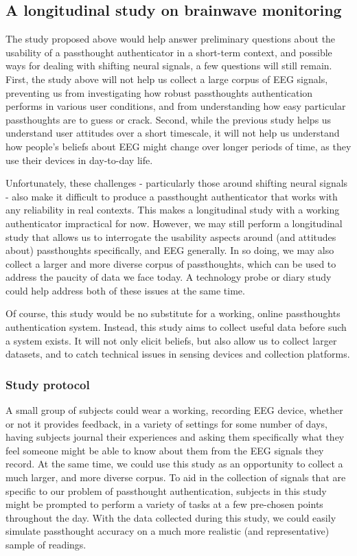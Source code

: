 \documentclass[sigconf]{acmart}
\begin{document}
\subsection{A longitudinal study on brainwave monitoring}
\label{sec:orge5483b9}

The study proposed above would help answer preliminary questions about
the usability of a passthought authenticator in a short-term context,
and possible ways for dealing with shifting neural signals,
a few questions will still remain.
First, the study above will not help us collect a large corpus of EEG signals, 
preventing us from investigating how robust passthoughts authentication performs in various user conditions,
and from understanding how easy particular passthoughts are to guess or crack.
Second, while the previous study helps us understand user attitudes over a short timescale,
it will not help us understand how people's beliefs about EEG might change over longer periods of time, as they use their devices in day-to-day life.

Unfortunately, these challenges - particularly those around shifting neural signals - also make it difficult to produce a passthought authenticator that works with any reliability in real contexts.
This makes a longitudinal study with a working authenticator impractical for now.
However, we may still perform a longitudinal study that allows us to interrogate the usability aspects around (and attitudes about) passthoughts specifically, and EEG generally.
In so doing, we may also collect a larger and more diverse corpus of passthoughts, which can be used to address the paucity of data we face today.
A technology probe or diary study \cite{Gaver1999} could help address both of these issues at the same time.

Of course, this study would be no substitute for a working, online passthoughts authentication system.
Instead, this study aims to collect useful data before such a system exists.
It will not only elicit beliefs, 
but also allow us to collect larger datasets, 
and to catch technical issues in sensing devices and collection platforms.

\subsubsection{Study protocol}
\label{sec:org63572ed}
A small group of subjects could wear a working, recording EEG device, whether or not it provides feedback, in a variety of settings for some number of days,
having subjects journal their experiences and asking them specifically what they feel someone might be able to know about them from the EEG signals they record.
At the same time, we could use this study as an opportunity to collect a much larger, and more diverse corpus.
To aid in the collection of signals that are specific to our problem of passthought authentication,
subjects in this study might be prompted to perform a variety of tasks at a few pre-chosen points throughout the day.
With the data collected during this study, we could easily simulate passthought accuracy on a much more realistic (and representative) sample of readings.
\end{document}
